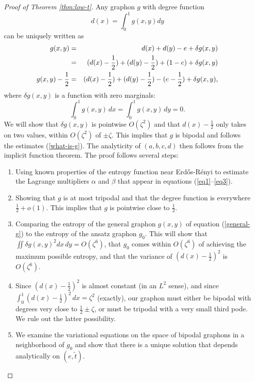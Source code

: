 \documentclass[12pt]{amsart}
\newcommand{\1}{\mathbf{1}}
\begin{document}
\begin{proof}[Proof of Theorem \ref{thm:low-t}]

Any graphon $g$ with degree function 
\begin{equation}
d(x) = \int_0^1 g(x,y) dy
\end{equation}
can be uniquely written as 
\begin{eqnarray}\label{general-g}
g(x,y) & = & d(x) + d(y) - e + \delta g(x,y) \cr 
& = & (d(x)-\frac12) + (d(y)-\frac12) + (1-e) + \delta g(x,y) \cr 
g(x,y)-\frac12 & = & (d(x)-\frac12) + (d(y)-\frac12) - (e - \frac12) + \delta g(x,y), 
\end{eqnarray}
where $\delta g(x,y)$ is a function with zero marginals: 
\begin{equation}
\int_0^1 g(x,y) \, dx = \int_0^1 g(x,y) \, dy = 0. 
\end{equation}
We will show that $\delta g(x,y)$ is pointwise $O(\zeta^2)$ and that $d(x) - \frac12$ only 
takes on two values, within $O(\zeta^2)$
of $\pm \zeta$. This implies that $g$ is bipodal and follows the estimates 
(\ref{what-is-g}). The analyticity of $(a,b,c,d)$ then follows from the implicit function
theorem. The proof follows 
several steps: 
\begin{enumerate}
\item Using known properties of the entropy function near Erd\H{o}s-R\'enyi to estimate the 
Lagrange multipliers $\alpha$ and $\beta$ that appear in equations (\ref{eq1}--\ref{eq3}).
\item Showing that $g$ is at most tripodal and that the degree function is everywhere 
$\frac12 + o(1)$. This implies that $g$ is pointwise close to $\frac12$.
\item Comparing the entropy of the general graphon $g(x,y)$ of equation (\ref{general-g})
to the entropy of the ansatz graphon $g_0$. This will show that $\iint \delta g(x,y)^2
dx \, dy = O(\zeta^6)$, that $g_0$ comes within $O(\zeta^6)$ of achieving the 
maximum possible entropy, and that the variance of $(d(x)-\frac12)^2$ is $O(\zeta^6)$. 
\item Since $(d(x)-\frac12)^2$ is almost constant (in an $L^2$ sense), and since 
$\int_0^1 (d(x)-\frac12)^2 \, dx = \zeta^2$ (exactly), our graphon must either be 
bipodal with degrees very close to $\frac12 \pm \zeta$, or must be tripodal with a 
very small third pode. We rule out the latter possibility. 
\item We examine the variational equations on the space of bipodal graphons in a 
neighborhood of $g_0$ and show that there is a unique solution that depends analytically
on $(e,\tilde t)$. 
\end{enumerate}


\end{proof}
\end{document}
